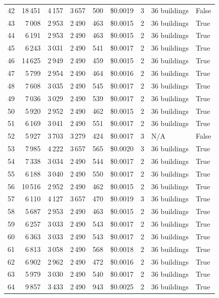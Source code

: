 \documentclass[a4paper,11pt]{article}
\begin{document}
\begin{table}[ht]
\begin{tabular}{r r r r r r r p{3cm} l}
42 & 18\,451 & 4\,157 & 3\,657 & 500 & \$0.0019 & 3 & 36 buildings & False \\
43 & 7\,008 & 2\,953 & 2\,490 & 463 & \$0.0015 & 2 & 36 buildings & True \\
44 & 6\,191 & 2\,953 & 2\,490 & 463 & \$0.0015 & 2 & 36 buildings & True \\
45 & 6\,243 & 3\,031 & 2\,490 & 541 & \$0.0017 & 2 & 36 buildings & True \\
46 & 14\,625 & 2\,949 & 2\,490 & 459 & \$0.0015 & 2 & 36 buildings & True \\
47 & 5\,799 & 2\,954 & 2\,490 & 464 & \$0.0016 & 2 & 36 buildings & True \\
48 & 7\,608 & 3\,035 & 2\,490 & 545 & \$0.0017 & 2 & 36 buildings & True \\
49 & 7\,036 & 3\,029 & 2\,490 & 539 & \$0.0017 & 2 & 36 buildings & True \\
50 & 5\,920 & 2\,952 & 2\,490 & 462 & \$0.0015 & 2 & 36 buildings & True \\
51 & 6\,169 & 3\,041 & 2\,490 & 551 & \$0.0017 & 2 & 36 buildings & True \\
52 & 5\,927 & 3\,703 & 3\,279 & 424 & \$0.0017 & 3 & N/A & False \\
53 & 7\,985 & 4\,222 & 3\,657 & 565 & \$0.0020 & 3 & 36 buildings & True \\
54 & 7\,338 & 3\,034 & 2\,490 & 544 & \$0.0017 & 2 & 36 buildings & True \\
55 & 6\,188 & 3\,040 & 2\,490 & 550 & \$0.0017 & 2 & 36 buildings & True \\
56 & 10\,516 & 2\,952 & 2\,490 & 462 & \$0.0015 & 2 & 36 buildings & True \\
57 & 6\,110 & 4\,127 & 3\,657 & 470 & \$0.0019 & 3 & 36 buildings & True \\
58 & 5\,687 & 2\,953 & 2\,490 & 463 & \$0.0015 & 2 & 36 buildings & True \\
59 & 6\,257 & 3\,033 & 2\,490 & 543 & \$0.0017 & 2 & 36 buildings & True \\
60 & 6\,363 & 3\,033 & 2\,490 & 543 & \$0.0017 & 2 & 36 buildings & True \\
61 & 6\,813 & 3\,058 & 2\,490 & 568 & \$0.0018 & 2 & 36 buildings & True \\
62 & 6\,902 & 2\,962 & 2\,490 & 472 & \$0.0016 & 2 & 36 buildings & True \\
63 & 5\,979 & 3\,030 & 2\,490 & 540 & \$0.0017 & 2 & 36 buildings & True \\
64 & 9\,857 & 3\,433 & 2\,490 & 943 & \$0.0025 & 2 & 36 buildings & True \\

\end{tabular}
\end{table}
\end{document}
